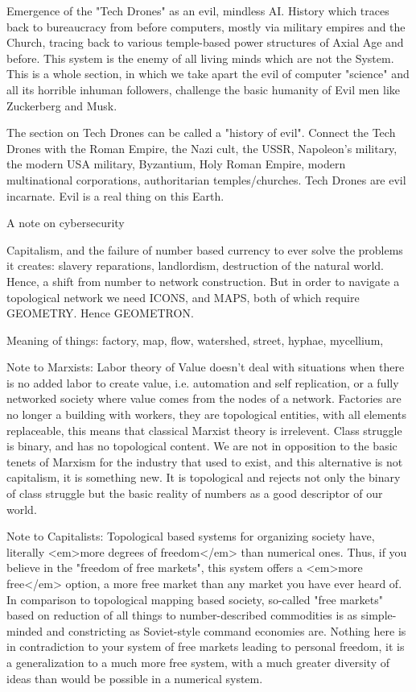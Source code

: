 \documentclass[11pt]{article}
\begin{document}
Emergence of the "Tech Drones" as an evil, mindless AI.  History which traces back to bureaucracy from before computers, mostly via military empires and the Church, tracing back to various temple-based power structures of Axial Age and before.  This system is the enemy of all living minds which are not the System.  This is a whole section, in which we take apart the evil of computer "science" and all its horrible inhuman followers, challenge the basic humanity of Evil men like Zuckerberg and Musk.




The section on Tech Drones can be called a "history of evil".  Connect the Tech Drones with the Roman Empire, the Nazi cult, the USSR, Napoleon's military, the modern USA military, Byzantium, Holy Roman Empire, modern multinational corporations, authoritarian temples/churches.  Tech Drones are evil incarnate.  Evil is a real thing on this Earth.




A note on cybersecurity




Capitalism, and the failure of number based currency to ever solve the problems it creates: slavery reparations, landlordism, destruction of the natural world.  Hence, a shift from number to network construction.  But in order to navigate a topological network we need ICONS, and MAPS, both of which require GEOMETRY.  Hence GEOMETRON.




Meaning of things: factory, map, flow, watershed, street, hyphae, mycellium, 




Note to Marxists: Labor theory of Value doesn't deal with situations when there is no added labor to create value, i.e. automation and self replication, or a fully networked society where value comes from the nodes of a network.  Factories are no longer a building with workers, they are topological entities, with all elements replaceable, this means that classical Marxist theory is irrelevent.  Class struggle is binary, and has no topological content.  We are not in opposition to the basic tenets of Marxism for the industry that used to exist, and this alternative is not capitalism, it is something new.  It is topological and rejects not only the binary of class struggle but the basic reality of numbers as a good descriptor of our world.  




Note to Capitalists: Topological based systems for organizing society have, literally <em>more degrees of freedom</em> than numerical ones.  Thus, if you believe in the "freedom of free markets", this system offers a <em>more free</em> option, a more free market than any market you have ever heard of.  In comparison to topological mapping based society, so-called "free markets" based on reduction of all things to number-described commodities is as simple-minded and constricting as Soviet-style command economies are.  Nothing here is in contradiction to your system of free markets leading to personal freedom, it is a generalization to a much more free system, with a much greater diversity of ideas than would be possible in a numerical system.
\end{document}
